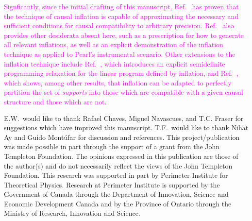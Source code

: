 \documentclass[aps,english,10pt,superscriptaddress,onecolumn,twoside,longbibliography,pra,floatfix,fleqn,nofootinbib]{revtex4-1}
\theoremstyle{definition}
\newcommand{\elie}[1]{\textcolor{Fuchsia}{#1}}
\begin{document}
\elie{Signficantly, since the initial drafting of this manuscript, Ref.~\cite{Navascues2017completelysolves} has proven that the technique of causal inflation is capable of approximating the necessary and sufficient conditions for causal compatibility to arbitrary precision. Ref.~\cite{Navascues2017completelysolves} also provides other desiderata absent here, such as a prescription for how to generate all relevant inflations, as well as an explicit demonstration of the inflation technique as applied to Pearl's instrumental scenario. Other extensions to the inflation technique include Ref.~\cite{Wolfe2018quantuminflation}, which introduces an explicit semidefinite programming relaxation for the linear program defined by inflation, and Ref.~\cite{TC2018masters}, which shows, among other results, that inflation can be adapted to perfectly partition the set of \emph{supports} into those which are compatible with a given causal structure and those which are not.}


\begin{acknowledgments}
E.W.~would like to thank Rafael Chaves, Miguel Navascues, and T.C. Fraser for suggestions which have improved this manuscript. T.F.~would like to thank Nihat Ay and Guido Mont\'ufar for discussion and references. This project/publication was made possible in part through the support of a grant  from the John Templeton Foundation. The opinions expressed in this publication are those of the author(s) and do not necessarily reflect the views of the John Templeton Foundation. This research was supported in part by Perimeter Institute for Theoretical Physics. Research at Perimeter Institute is supported by the Government of Canada through the Department of Innovation, Science and Economic Development Canada and by the Province of Ontario through the Ministry of Research, Innovation and Science.  
\end{acknowledgments}

\appendix
{}
\let\stdsection\section
\renewcommand{\section}{\clearpage\stdsection} 
\end{document}
